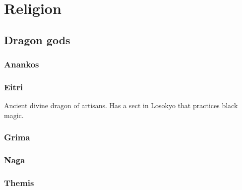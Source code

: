 \section{Religion}
\subsection{Dragon gods}
\subsubsection{Anankos}
\label{religion:anankos}

\subsubsection{Eitri}
\label{religion:eitri}
Ancient divine dragon of artisans. Has a sect in Losokyo that practices black magic.

\subsubsection{Grima}
\label{religion:grima}

\subsubsection{Naga}
\label{religion:naga}

\subsubsection{Themis}
\label{religion:themis}
